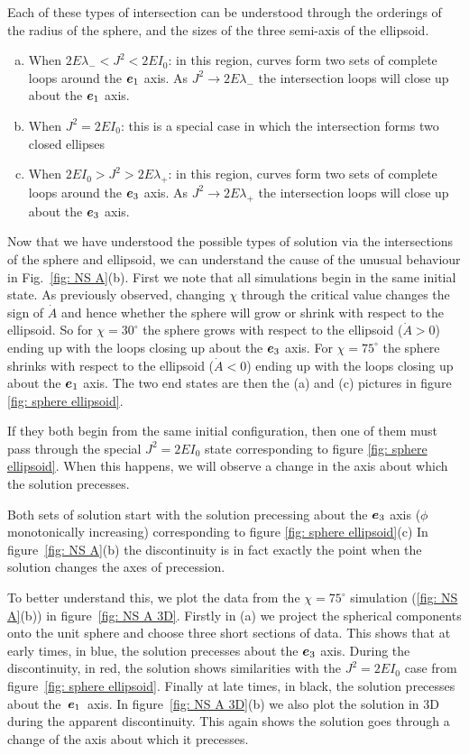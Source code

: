 \documentclass[../full_thesis/full_thesis.tex]{subfiles}
\begin{document}
Each of these types of intersection can be understood through the orderings of
the radius of the sphere, and the sizes of the three semi-axis of the ellipsoid.
\begin{enumerate}[(a)]
\item When $2E\lambda_{-}<J^{2}<2EI_{0}$: in this region, curves form two sets of
    complete loops around the $\boldsymbol{e}_{1}$ axis. As $J^{2} \rightarrow 2E\lambda_{-}$
    the intersection loops will close up about the $\boldsymbol{e}_{1}$ axis.
\item When $J^{2} = 2EI_{0}$: this is a special case in which the intersection forms two
    closed ellipses
\item When $2EI_{0}>J^{2}>2E\lambda_{+}$: in this region, curves form two sets of
    complete loops around the $\boldsymbol{e}_{3}$ axis. As $J^{2} \rightarrow 2E\lambda_{+}$
    the intersection loops will close up about the $\boldsymbol{e}_{3}$ axis.
\end{enumerate}

Now that we have understood the possible types of solution via the intersections
of the sphere and ellipsoid, we can understand the cause of the unusual behaviour
in Fig.~\eqref{fig: NS A}(b). First we note that
all simulations begin in the same initial state. As previously observed,
changing $\chi$ through the critical value changes the sign of $\dot{A}$ and
hence whether the sphere will grow or shrink with respect to the ellipsoid. So
for $\chi=30^{\circ}$ the sphere grows with respect to the ellipsoid
($\dot{A}>0$) ending up with the loops closing up about the $\boldsymbol{e}_{3}$ axis. For
$\chi=75^{\circ}$ the sphere shrinks with respect to the ellipsoid
($\dot{A}<0$) ending up with the loops closing up about the $\boldsymbol{e}_{1}$ axis. The two
end states are then the (a) and (c) pictures in figure \ref{fig: sphere ellipsoid}.

If they both begin from the same initial configuration, then one of them must pass through
the special $J^{2}=2EI_{0}$ state corresponding to figure \ref{fig: sphere ellipsoid}.
When this happens, we will observe a change in the axis about which the solution
precesses.

Both sets of solution start with the solution precessing about the $\boldsymbol{e}_{3}$ axis
($\phi$ monotonically increasing) corresponding to figure \ref{fig: sphere ellipsoid}(c)
In figure~\ref{fig: NS A}(b) the discontinuity is in fact exactly the point
when the solution changes the axes of precession.

To better understand this, we plot the data from the
$\chi=75^{\circ}$ simulation (\ref{fig: NS A}(b)) in figure~\ref{fig: NS A 3D}. Firstly in (a)
we project the spherical components onto the unit sphere and choose three
short sections of data. This shows that at early times, in blue, the solution
precesses about the $\boldsymbol{e}_{3}$ axis. During the discontinuity, in red, the solution
shows similarities with the $J^{2}=2EI_{0}$ case from figure~\ref{fig: sphere
ellipsoid}. Finally at late times, in black, the solution precesses about
the~$\boldsymbol{e}_{1}$~axis. In figure~\ref{fig: NS A 3D}(b) we also plot the solution in
3D during the apparent discontinuity. This again shows the solution goes
through a change of the axis about which it precesses.
\end{document}
